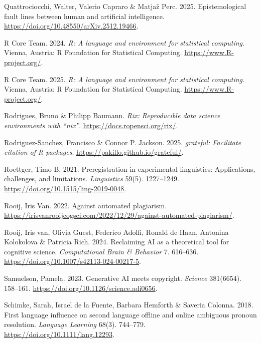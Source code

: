 \documentclass[
  letterpaper,
  DIV=11,
  numbers=noendperiod]{scrreprt}
\newlength{\cslhangindent}
\newenvironment{CSLReferences}[2] %
 {\begin{list}{}{%
  \setlength{\itemindent}{0pt}
  \setlength{\leftmargin}{0pt}
  \setlength{\parsep}{0pt}
  \ifodd #1
   \setlength{\leftmargin}{\cslhangindent}
   \setlength{\itemindent}{-1\cslhangindent}
  \fi
  \setlength{\itemsep}{#2\baselineskip}}}
 {\end{list}}
\begin{document}
\begin{CSLReferences}{1}{0}
Quattrociocchi, Walter, Valerio Capraro \& Matjaž Perc. 2025.
Epistemological fault lines between human and artificial intelligence.
\url{https://doi.org/10.48550/arXiv.2512.19466}.

R Core Team. 2024. \emph{R: A language and environment for statistical
computing}. Vienna, Austria: R Foundation for Statistical Computing.
\url{https://www.R-project.org/}.

R Core Team. 2025. \emph{{R}: A language and environment for statistical
computing}. Vienna, Austria: R Foundation for Statistical Computing.
\url{https://www.R-project.org/}.

Rodrigues, Bruno \& Philipp Baumann. \emph{Rix: Reproducible data
science environments with {``nix''}}.
\url{https://docs.ropensci.org/rix/}.

Rodriguez-Sanchez, Francisco \& Connor P. Jackson. 2025.
\emph{{grateful}: Facilitate citation of {R} packages}.
\url{https://pakillo.github.io/grateful/}.

Roettger, Timo B. 2021. Preregistration in experimental linguistics:
Applications, challenges, and limitations. \emph{Linguistics} 59(5).
1227--1249. \url{https://doi.org/10.1515/ling-2019-0048}.

Rooij, Iris Van. 2022. Against automated plagiarism.
\url{https://irisvanrooijcogsci.com/2022/12/29/against-automated-plagiarism/}.

Rooij, Iris van, Olivia Guest, Federico Adolfi, Ronald de Haan, Antonina
Kolokolova \& Patricia Rich. 2024. Reclaiming AI as a theoretical tool
for cognitive science. \emph{Computational Brain \& Behavior} 7.
616--636. \url{https://doi.org/10.1007/s42113-024-00217-5}.

Samuelson, Pamela. 2023. Generative AI meets copyright. \emph{Science}
381(6654). 158--161. \url{https://doi.org/10.1126/science.adi0656}.

Schimke, Sarah, Israel de la Fuente, Barbara Hemforth \& Saveria
Colonna. 2018. First language influence on second language offline and
online ambiguous pronoun resolution. \emph{Language Learning} 68(3).
744--779. \url{https://doi.org/10.1111/lang.12293}.


\end{CSLReferences}
\end{document}
